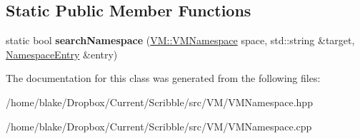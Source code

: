 \subsection*{Static Public Member Functions}
\begin{DoxyCompactItemize}
\item 
\hypertarget{class_v_m_1_1_namespace_entry_ad94072f8fd3f7c32e84028d58c6a6c5f}{static bool {\bfseries search\-Namespace} (\hyperlink{class_hash_map}{V\-M\-::\-V\-M\-Namespace} space, std\-::string \&target, \hyperlink{class_v_m_1_1_namespace_entry}{Namespace\-Entry} \&entry)}\label{class_v_m_1_1_namespace_entry_ad94072f8fd3f7c32e84028d58c6a6c5f}

\end{DoxyCompactItemize}


The documentation for this class was generated from the following files\-:\begin{DoxyCompactItemize}
\item 
/home/blake/\-Dropbox/\-Current/\-Scribble/src/\-V\-M/V\-M\-Namespace.\-hpp\item 
/home/blake/\-Dropbox/\-Current/\-Scribble/src/\-V\-M/V\-M\-Namespace.\-cpp\end{DoxyCompactItemize}
